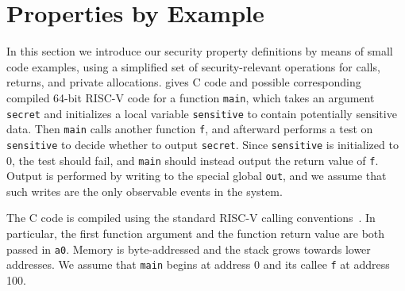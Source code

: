 \documentclass[10pt,conference]{ieeetran}%
\theoremstyle{definition}
\begin{document}
\section{Properties by Example}
\label{sec:example}

In this section we introduce our security property definitions by means
of small code examples, using a simplified set of security-relevant operations for
calls, returns, and private allocations.
 gives C code and possible corresponding compiled 64-bit RISC-V code
for a function {\tt main}, which
takes an argument {\tt secret} and initializes a local variable {\tt sensitive} to contain
potentially sensitive data.
Then {\tt main} calls another function {\tt f},
and afterward performs a test on {\tt sensitive} to decide whether
to output {\tt secret}.  Since {\tt sensitive} is initialized to 0,
the test should fail, and {\tt main} should instead output the return value of {\tt f}.
Output is performed by writing to the special global {\tt out},
and we assume that such writes are the only observable events in the system.

The C code is compiled using the standard RISC-V calling conventions~\cite{RISC-V-CC}.
In particular, the first function argument and the function
return value are both passed in {\tt a0}.
Memory is byte-addressed and the stack grows towards
lower addresses. We assume that {\tt main} begins at address 0 and its callee {\tt f} at address 100.

\newcommand{\freebox}[1][10pt]{\tikz \filldraw[fill=blue] (0,0) rectangle (#1,#1);}
\newcommand{\pubbox}[1][10pt]{\tikz \filldraw[fill=lightgray] (0,0) rectangle (#1,#1);}
\newcommand{\objbox}[1][10pt]{\tikz \filldraw[fill=yellow] (0,0) rectangle (#1,#1);}
\newcommand{\sealbox}[1][10pt]{\tikz \filldraw[fill=red] (0,0) rectangle (#1,#1);}

\newcommand{\textbox}[1][]{\tikz \filldraw[fill=lightgray] (0,0) rectangle (30pt,30pt) node[pos=.5]{#1};}
\newcommand{\numbox}[1][]{\tikz \filldraw[fill=lightgray] (0,0) rectangle (20pt,20pt) node[pos=.5]{#1};}
\newcommand{\leftbox}[1][]{\tikz \filldraw[fill=blue!20] (0,0) rectangle (20pt,20pt) node[pos=.5]{#1};}
\newcommand{\rightbox}[1][]{\tikz \filldraw[fill=orange!20] (0,0) rectangle (20pt,20pt) node[pos=.5]{#1};}
\end{document}
